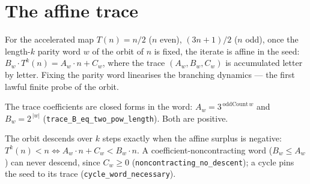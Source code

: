 \section{The affine trace}

\begin{theorem}
  \label{thm:collatz-affine-trace}
  \leanok
  For the accelerated map $T(n)=n/2$ ($n$ even), $(3n+1)/2$ ($n$ odd), once the length-$k$
  parity word $w$ of the orbit of $n$ is fixed, the iterate is affine in the seed:
  $B_w\cdot T^k(n)=A_w\cdot n+C_w$, where the trace $(A_w,B_w,C_w)$ is accumulated letter by
  letter. Fixing the parity word linearises the branching dynamics --- the first lawful finite
  probe of the orbit.
\end{theorem}
\begin{lemma}
  \label{lem:collatz-trace-powers}
  \leanok
  The trace coefficients are closed forms in the word: $A_w=3^{\,\mathrm{oddCount}\,w}$ and
  $B_w=2^{\,|w|}$ (\texttt{trace\_B\_eq\_two\_pow\_length}). Both are positive.
\end{lemma}
\begin{theorem}
  \label{thm:collatz-descent-iff}
  \leanok
  The orbit descends over $k$ steps exactly when the affine surplus is negative:
  $T^k(n)<n \iff A_w\cdot n+C_w<B_w\cdot n$. A coefficient-noncontracting word
  ($B_w\le A_w$) can never descend, since $C_w\ge 0$
  (\texttt{noncontracting\_no\_descent}); a cycle pins the seed to its trace
  (\texttt{cycle\_word\_necessary}).
\end{theorem}
